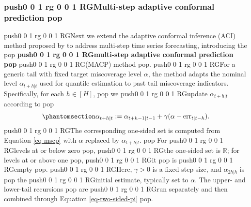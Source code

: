 \documentclass[
  american,
  12pt]{article}
\theoremstyle{plain}
\theoremstyle{plain}
\theoremstyle{remark}
\newcommand{\CPTSadd}[1]{\ifmmode\else\leavevmode\fi\pdfcolorstack 0 push{0 0 1 rg 0 0 1 RG}#1\pdfcolorstack 0 pop}
\begin{document}
\subsubsection{\CPTSadd{Multi-step adaptive conformal
prediction}}\label{multi-step-adaptive-conformal-prediction}

\CPTSadd{Next we extend the adaptive conformal inference (ACI) method proposed by
\citet{gibbs2021} to address multi-step time series forecasting,
introducing the} \textbf{\CPTSadd{multi-step adaptive conformal prediction}} \CPTSadd{(MACP)
method}. \CPTSadd{For a generic tail with fixed target miscoverage level
\(\alpha\), the method adapts the nominal level \(\alpha_{t+h|t}\) used
for quantile estimation to past tail miscoverage indicators.
Specifically, for each \(h \in [H]\),} we \CPTSadd{update \(\alpha_{t+h|t}\)
according to} \begin{equation}\phantomsection\label{eq-macp}{
\alpha_{t+h|t} := \alpha_{t+h-1|t-1} + \gamma(\alpha - \mathrm{err}_{t|t-h}).
}\end{equation} \CPTSadd{The corresponding one-sided set is computed from
Equation \eqref{eq-mscp} with \(\alpha\) replaced by \(\alpha_{t+h|t}\).}
For \CPTSadd{levels at or below zero}, \CPTSadd{the one-sided set is \(\mathbb R\); for
levels at or above one}, \CPTSadd{it} is \CPTSadd{empty}. \CPTSadd{Here, \(\gamma > 0\) is a fixed
step size, and \(\alpha_{2h|h}\) is} the \CPTSadd{initial estimate, typically set
to \(\alpha\). The upper- and lower-tail recursions} are \CPTSadd{run separately
and then combined through Equation \eqref{eq-two-sided-pi}}.
\end{document}
